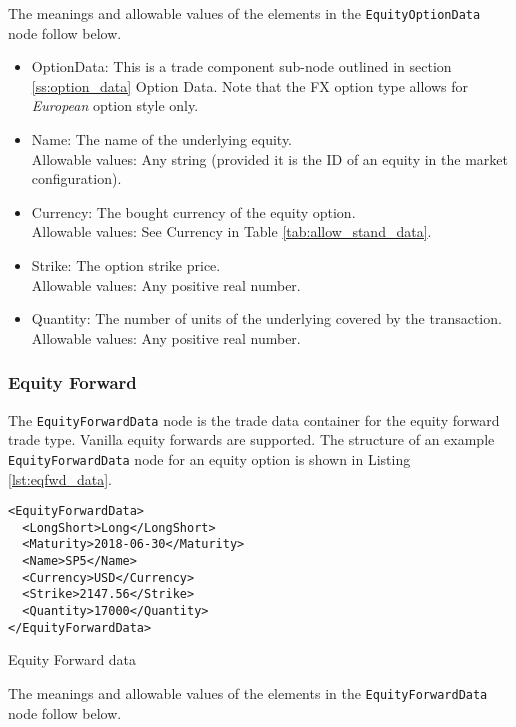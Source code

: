 The meanings and allowable values of the elements in the \lstinline!EquityOptionData!  node follow below.

\begin{itemize}
	\item OptionData: This is a trade component sub-node outlined in section \ref{ss:option_data} Option Data. Note 
	that the FX option type allows for \emph{European} option style only.	
	\item Name: The name of the underlying equity. \\
	Allowable values:  Any string (provided it is the ID of an equity in the market configuration).
	\item Currency: The bought currency of the equity option. \\
	Allowable values:  See Currency in Table \ref{tab:allow_stand_data}.	
	\item Strike: The option strike price.\\
	Allowable values:  Any positive real number.	
	\item Quantity: The number of units of the underlying covered by the transaction. \\
	Allowable values:  Any positive real number.
\end{itemize}

\subsubsection{Equity Forward}

The \lstinline!EquityForwardData!  node is the trade data container for the equity forward trade type.  Vanilla equity 
forwards are supported. The structure of an example \lstinline!EquityForwardData! node for an equity option is shown in 
Listing \ref{lst:eqfwd_data}.

\begin{listing}[H]
\begin{verbatim}
<EquityForwardData>
  <LongShort>Long</LongShort>
  <Maturity>2018-06-30</Maturity>
  <Name>SP5</Name>
  <Currency>USD</Currency>
  <Strike>2147.56</Strike>
  <Quantity>17000</Quantity>
</EquityForwardData>
\end{verbatim}
\caption{Equity Forward data}
\label{lst:eqfwd_data}
\end{listing}

The meanings and allowable values of the elements in the \lstinline!EquityForwardData!  node follow below.

